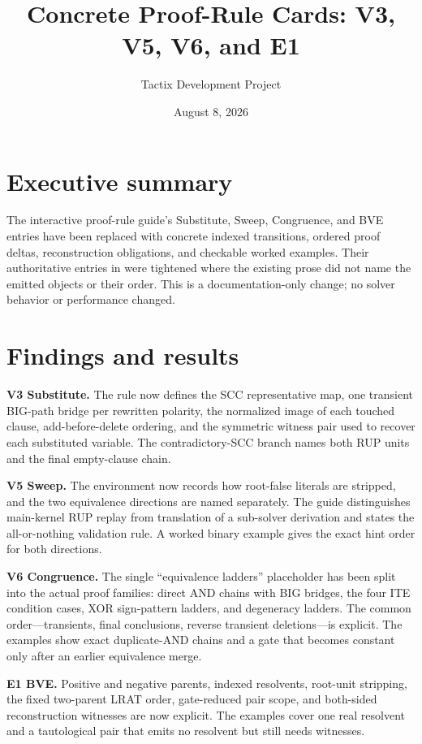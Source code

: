 \documentclass[11pt]{article}
\title{Concrete Proof-Rule Cards: V3, V5, V6, and E1}
\author{Tactix Development Project}
\date{August 8, 2026}
\begin{document}
\maketitle

\section*{Executive summary}
The interactive proof-rule guide's Substitute, Sweep, Congruence, and BVE
entries have been replaced with concrete indexed transitions, ordered proof
deltas, reconstruction obligations, and checkable worked examples.  Their
authoritative entries in  were tightened where the
existing prose did not name the emitted objects or their order.  This is a
documentation-only change; no solver behavior or performance changed.

\section{Findings and results}
\textbf{V3 Substitute.}  The rule now defines the SCC representative map, one
transient BIG-path bridge per rewritten polarity, the normalized image of each
touched clause, add-before-delete ordering, and the symmetric witness pair used
to recover each substituted variable.  The contradictory-SCC branch names both
RUP units and the final empty-clause chain.

\textbf{V5 Sweep.}  The environment now records how root-false literals are
stripped, and the two equivalence directions are named separately.  The guide
distinguishes main-kernel RUP replay from translation of a sub-solver derivation
and states the all-or-nothing validation rule.  A worked binary example gives
the exact hint order for both directions.

\textbf{V6 Congruence.}  The single ``equivalence ladders'' placeholder has
been split into the actual proof families: direct AND chains with BIG bridges,
the four ITE condition cases, XOR sign-pattern ladders, and degeneracy ladders.
The common order---transients, final conclusions, reverse transient
deletions---is explicit.  The examples show exact duplicate-AND chains and a
gate that becomes constant only after an earlier equivalence merge.

\textbf{E1 BVE.}  Positive and negative parents, indexed resolvents, root-unit
stripping, the fixed two-parent LRAT order, gate-reduced pair scope, and
both-sided reconstruction witnesses are now explicit.  The examples cover one
real resolvent and a tautological pair that emits no resolvent but still needs
witnesses.
\end{document}
